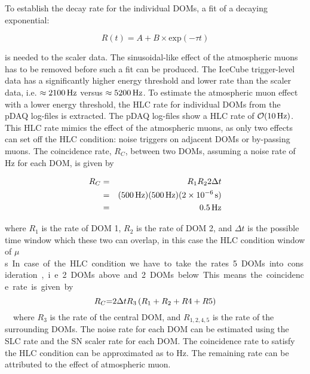 To establish the decay rate for the individual DOMs, a fit of a decaying exponential:

\begin{equation}
  R(t) = A + B \times \textrm{exp}\left( -\tau t \right)   
\end{equation} 

\noindent is needed to the scaler data. The sinusoidal-like effect of the atmospheric muons has to be removed before such a fit can be produced. The IceCube trigger-level data has a significantly higher energy threshold and lower rate than the scaler data, i.e. $\approx \unit[2100]{Hz}$ versus $\approx \unit[5200]{Hz}$. To estimate the atmospheric muon effect with a lower energy threshold, the HLC rate for individual DOMs from the pDAQ log-files is extracted. The pDAQ log-files show a HLC rate of $\mathcal{O}(\unit[10]{Hz})$. This HLC rate mimics the effect of the atmospheric muons, as only two effects can set off the HLC condition: noise triggers on adjacent DOMs or by-passing muons. The coincidence rate, $R_{C}$, between two DOMs, assuming a noise rate of \unit[500]{Hz} for each DOM, is given by

\begin{eqnarray}
  R_{C} &=& R_{1} R_{2} 2\Delta t \\ &=& (\unit[500]{Hz})(\unit[500]{Hz})(\unit[2 \times 10^{-6}]{s}) \\ &=& \unit[0.5]{Hz}
\end{eqnarray}

\noindent where $R_{1}$ is the rate of DOM 1, $R_{2}$ is the rate of DOM 2, and $\Delta t$ is the possible time window which these two can overlap, in this case the HLC condition window of \unit[1]{$\mu$s}. In case of the HLC condition we have to take the rates 5 DOMs into consideration, i.e. 2 DOMs above and 2 DOMs below. This means the coincidence rate is given by

\begin{equation}
  R_{C} $=$ 2 \Delta t R_{3}\left( R_{1} + R_{2} + R{4} + R{5} \right)
\end{equation}

\noindent where $R_{3}$ is the rate of the central DOM, and $R_{1, 2, 4, 5}$ is the rate of the surrounding DOMs. The noise rate for each DOM can be estimated using the SLC rate and the SN scaler rate for each DOM. The coincidence rate to satisfy the HLC condition can be approximated as to \unit[2]{Hz}. The remaining rate can be attributed to the effect of atmospheric muon. 

